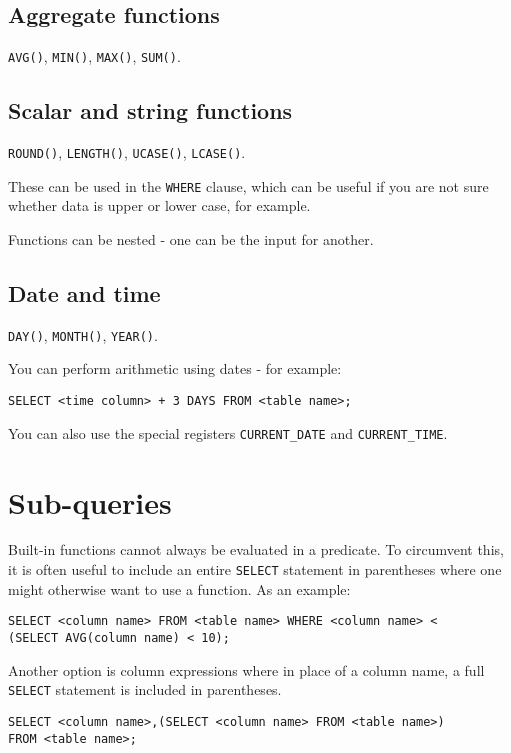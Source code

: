 \documentclass[]{article}
\begin{document}
\subsection{Aggregate functions}
\verb|AVG()|,
\verb|MIN()|,
\verb|MAX()|,
\verb|SUM()|.


\subsection{Scalar and string functions}
\verb|ROUND()|,
\verb|LENGTH()|,
\verb|UCASE()|,
\verb|LCASE()|.

These can be used in the \verb|WHERE| clause, which can be useful if you are not sure whether data is upper or lower case, for example.

Functions can be nested - one can be the input for another.

\subsection{Date and time}
\verb|DAY()|,
\verb|MONTH()|,
\verb|YEAR()|.

You can perform arithmetic using dates - for example: 
\begin{verbatim}
SELECT <time column> + 3 DAYS FROM <table name>;
\end{verbatim}

You can also use the special registers \verb|CURRENT_DATE| and \verb|CURRENT_TIME|.

\section{Sub-queries}
Built-in functions cannot always be evaluated in a predicate. To circumvent this, it is often useful to include an entire \verb|SELECT| statement in parentheses where one might otherwise want to use a function.  As an example:

\begin{verbatim}
SELECT <column name> FROM <table name> WHERE <column name> < 
(SELECT AVG(column name) < 10);
\end{verbatim}

Another option is column expressions where in place of a column name, a full \verb|SELECT| statement is included in parentheses.

\begin{verbatim}
SELECT <column name>,(SELECT <column name> FROM <table name>) 
FROM <table name>;
\end{verbatim}
\end{document}
